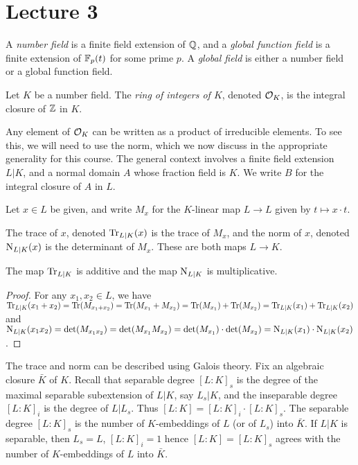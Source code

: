 \section{Lecture 3}

\begin{definition}
  A \emph{number field} is a finite field extension of $\mathbb{Q}$, and a \emph{global function field} is a finite extension of $\mathbb{F}_{p}(t)$ for some prime $p$.
  A \emph{global field} is either a number field or a global function field.
\end{definition}

\begin{definition}
  Let $K$ be a number field.
  The \emph{ring of integers of $K$}, denoted $\mathcal{O}_{K}$, is the integral closure of $\mathbb{Z}$ in $K$.
\end{definition}

Any element of $\mathcal{O}_{K}$ can be written as a product of irreducible elements.
To see this, we will need to use the norm, which we now discuss in the appropriate generality for this course.
The general context involves a finite field extension $L|K$, and a normal domain $A$ whose fraction field is $K$.
We write $B$ for the integral closure of $A$ in $L$.

Let $x \in L$ be given, and write $M_{x}$ for the $K$-linear map $L \to L$ given by $t \mapsto x \cdot t$.
\begin{definition}
  The trace of $x$, denoted $\operatorname{Tr}_{L|K}(x)$ is the trace of $M_{x}$, and the norm of $x$, denoted $\operatorname{N}_{L|K}(x)$ is the determinant of $M_{x}$.
  These are both maps $L \to K$.
\end{definition}

\begin{lemma}
  The map $\operatorname{Tr}_{L|K}$ is additive and the map $\operatorname{N}_{L|K}$ is multiplicative.
\end{lemma}
\begin{proof}
  For any $x_1, x_2\in L$, we have $\operatorname{Tr}_{L|K}(x_1 + x_2) = \operatorname{Tr}(M_{x_1 + x_2}) = \operatorname{Tr}(M_{x_1} + M_{x_2}) = \operatorname{Tr}(M_{x_1}) + \operatorname{Tr}(M_{x_2}) = \operatorname{Tr}_{L|K}(x_1) + \operatorname{Tr}_{L|K}(x_2)$ and $\operatorname{N}_{L|K}(x_1x_2) = \det(M_{x_1x_2}) = \det(M_{x_1} M_{x_2}) = \det(M_{x_1})\cdot \det(M_{x_2}) = \operatorname{N}_{L|K}(x_1)\cdot \operatorname{N}_{L|K}(x_2)$.
\end{proof}

The trace and norm can be described using Galois theory.
Fix an algebraic closure $\bar K$ of $K$.
Recall that separable degree $[L:K]_{s}$ is the degree of the maximal separable subextension of $L|K$, say $L_{s}|K$, and the inseparable degree $[L:K]_{i}$ is the degree of $L|L_{s}$.
Thus $[L:K] = [L:K]_{i} \cdot [L:K]_{s}$.
The separable degree $[L:K]_{s}$ is the number of $K$-embeddings of $L$ (or of $L_{s}$) into $\bar K$.
If $L|K$ is separable, then $L_{s} = L$, $[L:K]_{i} = 1$ hence $[L:K] = [L:K]_{s}$ agrees with the number of $K$-embeddings of $L$ into $\bar K$.

